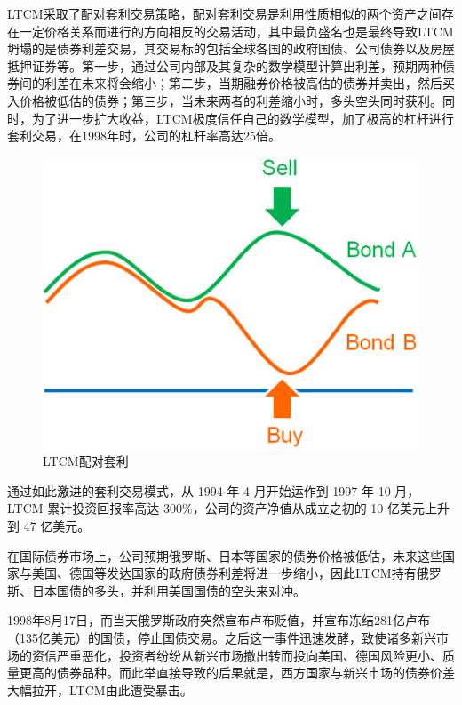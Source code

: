LTCM采取了配对套利交易策略，配对套利交易是利用性质相似的两个资产之间存在一定价格关系而进行的方向相反的交易活动，其中最负盛名也是最终导致LTCM坍塌的是债券利差交易，其交易标的包括全球各国的政府国债、公司债券以及房屋抵押证券等。第一步，通过公司内部及其复杂的数学模型计算出利差，预期两种债券间的利差在未来将会缩小；第二步，当期融券价格被高估的债券并卖出，然后买入价格被低估的债券；第三步，当未来两者的利差缩小时，多头空头同时获利。同时，为了进一步扩大收益，LTCM极度信任自己的数学模型，加了极高的杠杆进行套利交易，在1998年时，公司的杠杆率高达25倍。
    \begin{figure}[H]
        \centering
        \includegraphics[width=\linewidth]{img/ltcm.jpg}
        \caption{LTCM配对套利}
    \end{figure}
    
通过如此激进的套利交易模式，从 1994 年 4 月开始运作到 1997 年 10 月，LTCM 累计投资回报率高达 300\%，公司的资产净值从成立之初的 10 亿美元上升到 47 亿美元。

在国际债券市场上，公司预期俄罗斯、日本等国家的债券价格被低估，未来这些国家与美国、德国等发达国家的政府债券利差将进一步缩小，因此LTCM持有俄罗斯、日本国债的多头，并利用美国国债的空头来对冲。

1998年8月17日，而当天俄罗斯政府突然宣布卢布贬值，并宣布冻结281亿卢布（135亿美元）的国债，停止国债交易。之后这一事件迅速发酵，致使诸多新兴市场的资信严重恶化，投资者纷纷从新兴市场撤出转而投向美国、德国风险更小、质量更高的债券品种。而此举直接导致的后果就是，西方国家与新兴市场的债券价差大幅拉开，LTCM由此遭受暴击。


